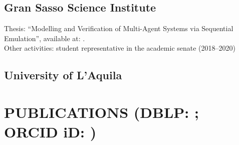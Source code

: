 \documentclass[a4paper]{deedy-resume-openfont}
\begin{document}
\begin{minipage}[t]{0.67\textwidth}
\subsection{Gran Sasso Science Institute}
\vspace{\topsep} %
Thesis: ``Modelling and Verification of Multi-Agent Systems via Sequential Emulation'',
available at: \href{http://hdl.handle.net/20.500.12571/10181}{}.\\
Other activities: student representative in the academic senate (2018--2020)
\sectionsep%

\subsection{University of L'Aquila}
\sectionsep%

\section[Publications]{PUBLICATIONS \small{(DBLP\@: \href{https://dblp.org/pid/215/9758}{}; ORCID iD\@: \href{https://orcid.org/0000-0003-1922-3151}{})}}
\vspace{\topsep} %

\nocite{*}

\sectionsep%


\end{minipage}
\end{document}
